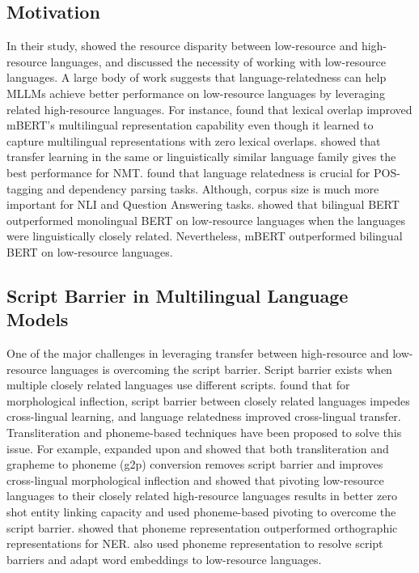 \documentclass[11pt]{article}
\begin{document}
\subsection{Motivation}
\label{motivation}
In their study, \citet{joshi-etal-2020-state} showed the resource disparity between low-resource and high-resource languages, and \citet{ruder2020beyondenglish} discussed the necessity of working with low-resource languages. A large body of work suggests that language-relatedness can help MLLMs achieve better performance on low-resource languages by leveraging related high-resource languages. For instance, \citet{pires-etal-2019-multilingual} found that lexical overlap improved mBERT’s multilingual representation capability even though it learned to capture multilingual representations with zero lexical overlaps. \citet{dabre-etal-2017-empirical} showed that transfer learning in the same or linguistically similar language family gives the best performance for NMT. \citet{lauscher-etal-2020-zero} found that language relatedness is crucial for POS-tagging and dependency parsing tasks. Although, corpus size is much more important for NLI and Question Answering tasks. \citet{wu-dredze-2020-languages} showed that bilingual BERT outperformed monolingual BERT on low-resource languages when the languages were linguistically closely related. Nevertheless, mBERT outperformed bilingual BERT on low-resource languages. 
\subsection{Script Barrier in Multilingual Language Models}
\label{barrier}
One of the major challenges in leveraging transfer between high-resource and low-resource languages is overcoming the script barrier. Script barrier exists when multiple closely related languages use different scripts. \citet{anastasopoulos-neubig-2019-pushing} found that for morphological inflection, script barrier between closely related languages impedes cross-lingual learning, and language relatedness improved cross-lingual transfer. Transliteration and phoneme-based techniques have been proposed to solve this issue. For example, \citet{murikinati-etal-2020-transliteration} expanded upon \citet{anastasopoulos-neubig-2019-pushing} and showed that both transliteration and grapheme to phoneme (g2p) conversion removes script barrier and improves cross-lingual morphological inflection and \citet{Rijhwani2019ZeroshotNT} showed that pivoting low-resource languages to their closely related high-resource languages results in better zero shot entity linking capacity and used phoneme-based pivoting to overcome the script barrier. \citet{bharadwaj-etal-2016-phonologically} showed that phoneme representation outperformed orthographic representations for NER. \citet{Chaudhary2018AdaptingWE} also used phoneme representation to resolve script barriers and adapt word embeddings to low-resource languages. 
\end{document}
